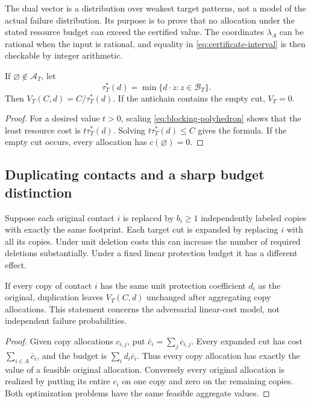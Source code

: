 The dual vector is a distribution over weakest target patterns, not a model of the actual failure distribution. Its purpose is to prove that no allocation under the stated resource budget can exceed the certified value. The coordinates $\lambda_A$ can be rational when the input is rational, and equality in \cref{eq:certificate-interval} is then checkable by integer arithmetic.

\begin{corollary}
If $\varnothing\notin\mathcal A_T$, let
\[
\tau_T^*(d)=\min\{d\cdot z:z\in\mathcal B_T\}.
\]
Then $V_T(C,d)=C/\tau_T^*(d)$. If the antichain contains the empty cut, $V_T=0$.
\end{corollary}
\begin{proof}
For a desired value $t>0$, scaling \cref{eq:blocking-polyhedron} shows that the least resource cost is $t\tau_T^*(d)$. Solving $t\tau_T^*(d)\le C$ gives the formula. If the empty cut occurs, every allocation has $c(\varnothing)=0$.
\end{proof}

\subsection{Duplicating contacts and a sharp budget distinction}
Suppose each original contact $i$ is replaced by $b_i\ge1$ independently labeled copies with exactly the same footprint. Each target cut is expanded by replacing $i$ with all its copies. Under unit deletion costs this can increase the number of required deletions substantially. Under a fixed linear protection budget it has a different effect.

\begin{proposition}\label{prop:duplication}
If every copy of contact $i$ has the same unit protection coefficient $d_i$ as the original, duplication leaves $V_T(C,d)$ unchanged after aggregating copy allocations. This statement concerns the adversarial linear-cost model, not independent failure probabilities.
\end{proposition}
\begin{proof}
Given copy allocations $c_{i,j}$, put $\bar c_i=\sum_jc_{i,j}$. Every expanded cut has cost $\sum_{i\in A}\bar c_i$, and the budget is $\sum_i d_i\bar c_i$. Thus every copy allocation has exactly the value of a feasible original allocation. Conversely every original allocation is realized by putting its entire $c_i$ on one copy and zero on the remaining copies. Both optimization problems have the same feasible aggregate values.
\end{proof}

